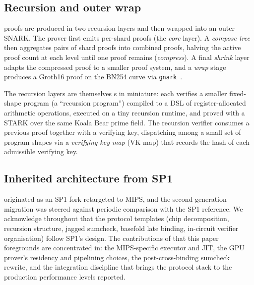 \subsection{Recursion and outer wrap}

\zkVM{} proofs are produced in two recursion layers and then wrapped into an outer SNARK. The prover first emits per-shard proofs (the \emph{core} layer). A \emph{compose tree} then aggregates pairs of shard proofs into combined proofs, halving the active proof count at each level until one proof remains (\emph{compress}). A final \emph{shrink} layer adapts the compressed proof to a smaller proof system, and a \emph{wrap} stage produces a Groth16 proof on the BN254 curve via \texttt{gnark}~\citep{gnark}.

The recursion layers are themselves \zkVM s in miniature: each verifies a smaller fixed-shape program (a ``recursion program'') compiled to a DSL of register-allocated arithmetic operations, executed on a tiny recursion runtime, and proved with a STARK over the same Koala Bear prime field. The recursion verifier consumes a previous proof together with a verifying key, dispatching among a small set of program shapes via a \emph{verifying key map} (VK map) that records the hash of each admissible verifying key.

\subsection{Inherited architecture from SP1}

\Ziren{} originated as an SP1 fork retargeted to MIPS, and the second-generation migration was steered against periodic comparison with the SP1 reference. We acknowledge throughout that the protocol templates (chip decomposition, recursion structure, jagged sumcheck, basefold late binding, in-circuit verifier organisation) follow SP1's design. The contributions of \Zirenver{} that this paper foregrounds are concentrated in: the MIPS-specific executor and JIT, the GPU prover's residency and pipelining choices, the post-cross-binding sumcheck rewrite, and the integration discipline that brings the protocol stack to the production performance levels reported.
